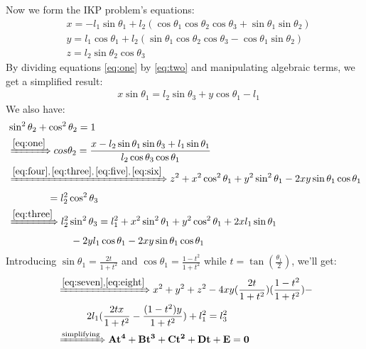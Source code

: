 \documentclass[conference]{IEEEtran}
\begin{document}
Now we form the IKP problem's equations:
\begin{align}
     & x = -l_1 \sin\theta_1 + l_2 (\cos\theta_1 \cos\theta_2 \cos\theta_3 + \sin\theta_1 \sin\theta_2) \label{eq:one} \\
     & y = l_1 \cos\theta_1 + l_2 (\sin\theta_1 \cos\theta_2 \cos\theta_3 - \cos\theta_1 \sin\theta_2)  \label{eq:two} \\
     & z = l_2 \sin\theta_2 \cos\theta_3 \label{eq:four}
\end{align}
By dividing equations \ref{eq:one} by \ref{eq:two} and manipulating algebraic terms, we get a simplified result:
\begin{align}
     & x \sin \theta_1 = l_2 \sin \theta_3 + y \cos \theta_1 - l_1 \label{eq:three}
\end{align}
We also have:
\begin{align}
     & \sin ^2 \theta_2 + \cos ^2 \theta_2 = 1 \label{eq:five}                                                                                                                           \\
     & \xRightarrow{\ref{eq:one}} cos \theta_2 = \frac{x - l_2 \sin \theta_1 \sin \theta_3 + l_1 \sin \theta_1}{l_2 \cos \theta_3 \cos \theta_1} \label{eq:six}                          \\
     & \xRightarrow{\ref{eq:four}, \, \ref{eq:three}, \, \ref{eq:five}, \, \ref{eq:six}} z^2 + x^2 \cos ^2 \theta_1 + y^2 \sin ^2 \theta_1 - 2 x y \sin \theta_1 \cos \theta_1 \nonumber \\
     & \quad \quad \quad \quad = l_2 ^2 \cos ^2 \theta_3 \label{eq:seven}                                                                                                                \\
     & \xRightarrow{\ref{eq:three}} l_2 ^2 \sin ^2 \theta_3 = l_1 ^2 + x^2 \sin ^2 \theta_1 + y^2 \cos ^2 \theta_1 + 2 x l_1 \sin \theta_1 \nonumber                                     \\
     & \quad \quad \quad \quad \quad \quad \,\, - 2 y l_1 \cos \theta_1 - 2 x y \sin \theta_1 \cos \theta_1 \label{eq:eight}
\end{align}
Introducing $\sin \theta_1 = \frac{2 t}{1 + t^2}$ and $\cos \theta_1 = \frac{1 - t^2}{1 + t^2}$ while $t = \tan (\frac{\theta_1}{2})$, we'll get:
\begin{align}
     & \xRightarrow{\ref{eq:seven}, \ref{eq:eight}} x^2 + y^2 + z^2 - 4 x y (\frac{2 t}{1 + t^2}) (\frac{1 - t^2}{1 + t^2}) - \nonumber \\
     & \quad \quad \quad 2 l_1 (\frac{2 t x}{1 + t^2} - \frac{(1 - t^2) y}{1 + t^2}) + l_1 ^2 = l_3 ^2                                  \\
     & \xRightarrow{\text{simplifying}} \mathbf{A t^4 + B t^3 + C t^2 + D t + E = 0}
\end{align}
\end{document}
